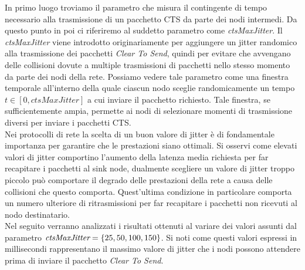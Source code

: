 \documentclass[binding=0.6cm,TFA]{sapthesis}
\begin{document}
In primo luogo troviamo il parametro che misura il contingente di tempo necessario alla trasmissione di un pacchetto CTS da parte dei nodi intermedi. Da
questo punto in poi ci riferiremo al suddetto parametro come \emph{ctsMaxJitter}. Il \emph{ctsMaxJitter} viene introdotto originariamente per
aggiungere un jitter randomico alla trasmissione dei pacchetti \emph{Clear To Send}, quindi per evitare che avvengano delle collisioni dovute a multiple
trasmissioni di pacchetti nello stesso momento da parte dei nodi della rete. Possiamo vedere tale parametro come una finestra temporale all'interno
della quale ciascun nodo sceglie randomicamente un tempo $t \in [0, ctsMaxJitter]$ a cui inviare il pacchetto richiesto. Tale finestra, se sufficientemente
ampia, permette ai nodi di selezionare momenti di trasmissione diversi per inviare i pacchetti CTS.\\

Nei protocolli di rete la scelta di un buon valore di jitter è di fondamentale importanza per garantire che le prestazioni siano ottimali. Si osservi
come elevati valori di jitter comportino l'aumento della latenza media richiesta per far recapitare i pacchetti al sink node, dualmente
scegliere un valore di jitter troppo piccolo può comportare il degrado delle prestazioni della rete a causa delle collisioni che questo comporta.
Quest'ultima condizione in particolare comporta un numero ulteriore di ritrasmissioni per far recapitare i pacchetti non ricevuti al nodo destinatario.\\

Nel seguito verranno analizzati i risultati ottenuti al variare dei valori assunti dal parametro $\emph{ctsMaxJitter}=\{25,50,100,150\}$. Si noti come
questi valori espressi in millisecondi rappresentano il massimo valore di jitter che i nodi possono attendere prima di inviare il pacchetto \emph{Clear To Send}.
\end{document}
